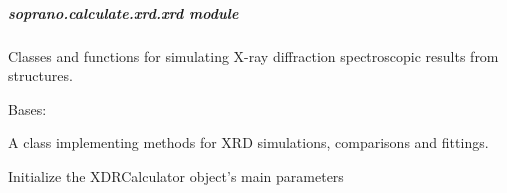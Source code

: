 \documentclass[letterpaper,10pt,english]{sphinxmanual}
\begin{document}
\begin{fulllineitems}
\end{fulllineitems}



\subparagraph{soprano.calculate.xrd.xrd module}
\label{doctree/soprano.calculate.xrd.xrd:module-soprano.calculate.xrd.xrd}\label{doctree/soprano.calculate.xrd.xrd::doc}\label{doctree/soprano.calculate.xrd.xrd:soprano-calculate-xrd-xrd-module}
Classes and functions for simulating X-ray diffraction
spectroscopic results from structures.

\begin{fulllineitems}
\label{doctree/soprano.calculate.xrd.xrd:soprano.calculate.xrd.xrd.XRDCalculator}
Bases: 

A class implementing methods for XRD simulations, comparisons and
fittings.

Initialize the XDRCalculator object's main parameters


\end{fulllineitems}
\end{document}
